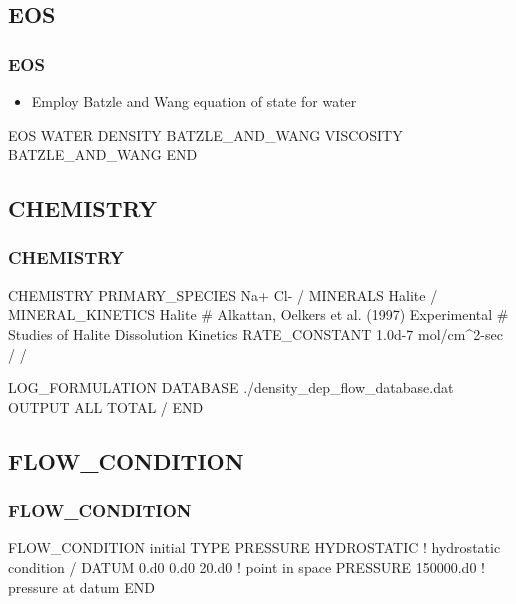 \documentclass{beamer}
\newcommand\bluecomment[1]{{{\color{blue} #1}}}
\begin{document}
\subsection{EOS}

\begin{frame}\frametitle{EOS}

\begin{itemize}
  \item Employ Batzle and Wang equation of state for water
\end{itemize}

\begin{semiverbatim}
  
EOS WATER
  DENSITY BATZLE_AND_WANG
  VISCOSITY BATZLE_AND_WANG
END
\end{semiverbatim}

\end{frame}

\subsection{CHEMISTRY}

\begin{frame}\frametitle{CHEMISTRY}
\begin{semiverbatim}
CHEMISTRY
  PRIMARY_SPECIES
    Na+
    Cl-
  /
  MINERALS
    Halite
  /
  MINERAL_KINETICS
    Halite
      \bluecomment{# Alkattan, Oelkers et al. (1997) Experimental
      #  Studies of Halite Dissolution Kinetics}
      RATE_CONSTANT 1.0d-7 mol/cm^2-sec 
    /
  /
  
  LOG_FORMULATION
  DATABASE ./density_dep_flow_database.dat
  OUTPUT
    ALL
    TOTAL
  /
END
\end{semiverbatim}

\end{frame}

\subsection{FLOW\_CONDITION}

\begin{frame}\frametitle{FLOW\_CONDITION}

\begin{semiverbatim}

FLOW_CONDITION initial
  TYPE
    PRESSURE HYDROSTATIC  \bluecomment{! hydrostatic condition}
  /
  DATUM 0.d0 0.d0 20.d0   \bluecomment{! point in space}
  PRESSURE 150000.d0      \bluecomment{! pressure at datum}
END
\end{semiverbatim}
\end{frame}
\end{document}
